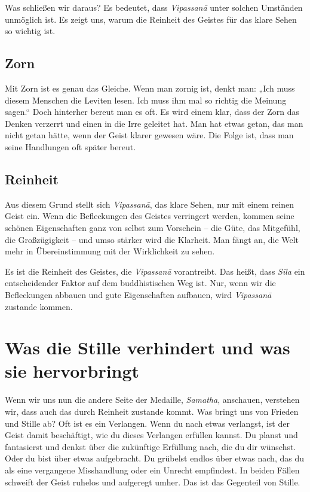 \documentclass[12pt,openany]{book}
\begin{document}
Was schließen wir daraus? Es bedeutet, dass \textit{Vipas\-sanā} unter solchen Umständen unmöglich ist. Es zeigt uns, warum die Reinheit des Geistes für das klare Sehen so wichtig ist.

\section*{Zorn}

Mit Zorn ist es genau das Gleiche. Wenn man zornig ist, denkt man: „Ich muss diesem Menschen die Leviten lesen. Ich muss ihm mal so richtig die Meinung sagen.“ Doch hinterher bereut man es oft. Es wird einem klar, dass der Zorn das Denken verzerrt und einen in die Irre geleitet hat. Man hat etwas getan, das man nicht getan hätte, wenn der Geist klarer gewesen wäre. Die Folge ist, dass man seine Handlungen oft später bereut.

\section*{Reinheit}

Aus diesem Grund stellt sich \textit{Vipas\-sanā}, das klare Sehen, nur mit einem reinen Geist ein. Wenn die Befleckungen des Geistes verringert werden, kommen seine schönen Eigenschaften ganz von selbst zum Vorschein – die Güte, das Mitgefühl, die Großzügigkeit – und umso stärker wird die Klarheit. Man fängt an, die Welt mehr in Übereinstimmung mit der Wirklichkeit zu sehen.

Es ist die Reinheit des Geistes, die \textit{Vipas\-sanā} vorantreibt. Das heißt, dass \textit{Sīla} ein entscheidender Faktor auf dem buddhistischen Weg ist. Nur, wenn wir die Befleckungen abbauen und gute Eigenschaften aufbauen, wird \textit{Vipas\-sanā} zustande kommen.

\chapter*{Was die Stille verhindert und was sie hervorbringt}

Wenn wir uns nun die andere Seite der Medaille, \textit{Samatha}, anschauen, verstehen wir, dass auch das durch Reinheit zustande kommt. Was bringt uns von Frieden und Stille ab? Oft ist es ein Verlangen. Wenn du nach etwas verlangst, ist der Geist damit beschäftigt, wie du dieses Verlangen erfüllen kannst. Du planst und fantasierst und denkst über die zukünftige Erfüllung nach, die du dir wünschst. Oder du bist über etwas aufgebracht. Du grübelst endlos über etwas nach, das du als eine vergangene Misshandlung oder ein Unrecht empfindest. In beiden Fällen schweift der Geist ruhelos und aufgeregt umher. Das ist das Gegenteil von Stille.
\end{document}
